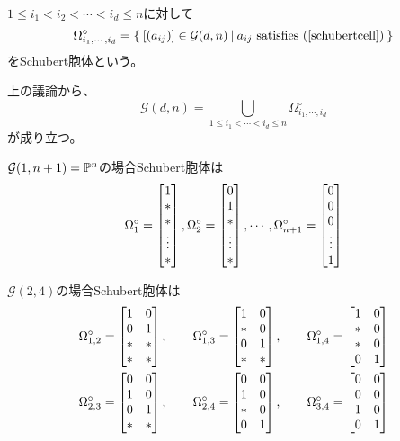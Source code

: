 \documentclass{ltjsreport}
\begin{document}
\begin{defin}
  $1\leq i_1<i_2<\cdots<i_d\leq n$に対して
  \[
  \Omega^\circ_{i_1,\cdots,i_d}=\left\{\:[(a_{ij})]\in\mathcal{G}(d,n)\:\middle|\:a_{ij}\text{ satisfies (\ref{schubertcell})}\:\right\}  
  \]
  をSchubert胞体という。
\end{defin}

上の議論から、
\[
\mathcal{G}(d,n)=\bigcup_{1\leq i_1<\cdots<i_d\leq n}\Omega^\circ_{i_1,\cdots,i_d}  
\]
が成り立つ。

\begin{eg}
  $\mathcal{G}(1,n+1)=\mathbb{P}^{n}$の場合Schubert胞体は
  \[
  \Omega_{1}^\circ=\begin{bmatrix} 1\\ * \\ * \\\vdots\\ * \end{bmatrix},
  \Omega_{2}^\circ=\begin{bmatrix} 0\\1\\ * \\\vdots\\ * \end{bmatrix},
  \cdots,
  \Omega_{n+1}^\circ=\begin{bmatrix} 0\\0\\0\\\vdots\\1 \end{bmatrix}
  \]
\end{eg}

\begin{eg}
$\mathcal{G}(2,4)$の場合Schubert胞体は
  \begin{align*}
    &\Omega^\circ_{1,2}=\begin{bmatrix} 
      1 & 0\\
      0 & 1\\
      * & *\\
      * & *
     \end{bmatrix},\qquad 
    \Omega^\circ_{1,3}=\begin{bmatrix} 
      1 & 0\\
      * & 0\\
      0 & 1\\
      * & *
     \end{bmatrix},\qquad
    \Omega^\circ_{1,4}=\begin{bmatrix} 
      1 & 0\\
      * & 0\\
      * & 0\\
      0 & 1
     \end{bmatrix}\\
    &\Omega^\circ_{2,3}=\begin{bmatrix} 
      0 & 0\\
      1 & 0\\
      0 & 1\\
      * & *
     \end{bmatrix},\qquad
    \Omega^\circ_{2,4}=\begin{bmatrix} 
      0 & 0\\
      1 & 0\\
      * & 0\\
      0 & 1
     \end{bmatrix},\qquad
    \Omega^\circ_{3,4}=\begin{bmatrix} 
      0 & 0\\
      0 & 0\\
      1 & 0\\
      0 & 1
     \end{bmatrix}
  \end{align*}
\end{eg}
\end{document}
